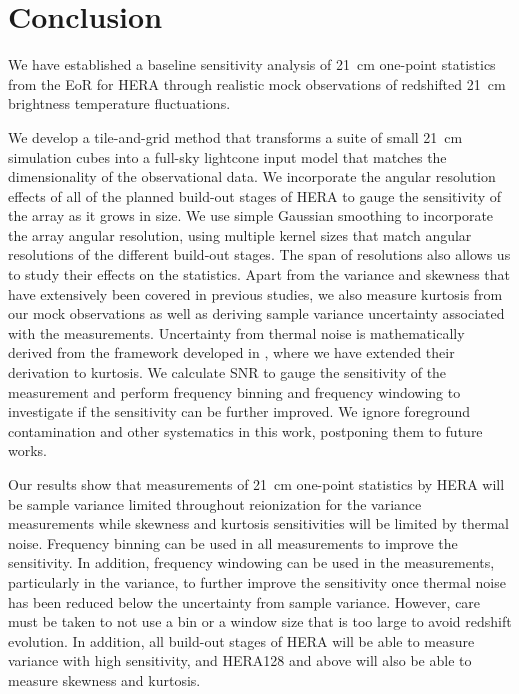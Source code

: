\documentclass[fleqn,usenatbib]{mnras}
\begin{document}
\section{Conclusion}\label{sec:conclusion}
We have established a baseline sensitivity analysis of 21~cm one-point statistics from the EoR for HERA through realistic mock observations of redshifted 21~cm brightness temperature fluctuations. 

We develop a tile-and-grid method that transforms a suite of small 21~cm simulation cubes into a full-sky lightcone input model that matches the dimensionality of the observational data. We incorporate the angular resolution effects of all of the planned build-out stages of HERA to gauge the sensitivity of the array as it grows in size. We use simple Gaussian smoothing to incorporate the array angular resolution, using multiple kernel sizes that match angular resolutions of the different build-out stages. The span of resolutions also allows us to study their effects on the statistics. Apart from the variance and skewness that have extensively been covered in previous studies, we also measure kurtosis from our mock observations as well as deriving sample variance uncertainty associated with the measurements. Uncertainty from thermal noise is mathematically derived from the framework developed in \citet{Watkinson:2014jv}, where we have extended their derivation to kurtosis. We calculate SNR to gauge the sensitivity of the measurement and perform frequency binning and frequency windowing to investigate if the sensitivity can be further improved. We ignore foreground contamination and other systematics in this work, postponing them to future works.

Our results show that measurements of 21~cm one-point statistics by HERA will be sample variance limited throughout reionization for the variance measurements while skewness and kurtosis sensitivities will be limited by thermal noise. Frequency binning can be used in all measurements to improve the sensitivity. In addition, frequency windowing can be used in the measurements, particularly in the variance, to further improve the sensitivity once thermal noise has been reduced below the uncertainty from sample variance. However, care must be taken to not use a bin or a window size that is too large to avoid redshift evolution. In addition, all build-out stages of HERA will be able to measure variance with high sensitivity, and HERA128 and above will also be able to measure skewness and kurtosis.
\end{document}
